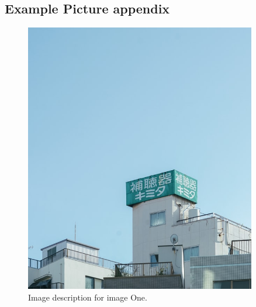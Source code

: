 \documentclass[
    a4paper,
    doc,
    11pt,
]{apa6}
\begin{document}
\newpage
\begin{appendices}
\setcounter{section}{1}


\begingroup
    \centering
    
    \label{append:lorem_ipsum}
\endgroup

\newpage
\subsection{Example Picture appendix}
\begingroup
    \begin{figure}[h!]
        \centering
        \label{append:pic:one}
        \includegraphics[width=0.9\textwidth]{appendix/imageExample/pOne.jpg}
        \caption{Image description for image One.}

\end{figure}
\end{appendices}
\end{document}

